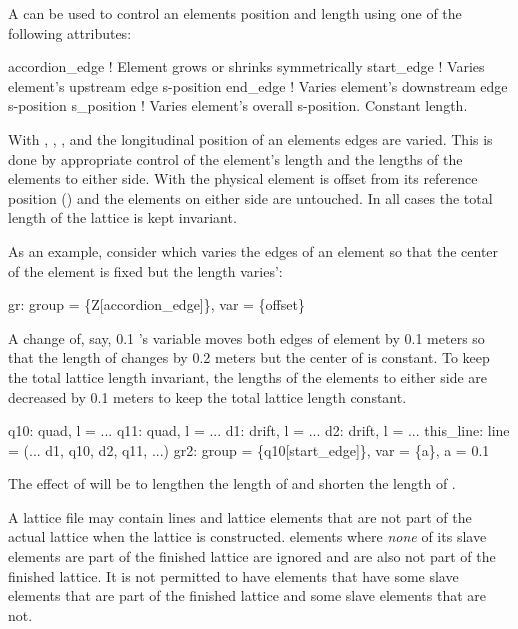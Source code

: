 A  can be used to control an elements position and length
using one of the following attributes:
\begin{example}
  accordion_edge  ! Element grows or shrinks symmetrically
  start_edge      ! Varies element's upstream edge s-position
  end_edge        ! Varies element's downstream edge s-position
  s_position      ! Varies element's overall s-position. Constant length.
\end{example}
With , , , and
 the longitudinal position of an elements edges are
varied. This is done by appropriate control of the element's length
and the lengths of the elements to either side. With 
the physical element is offset from its reference position
() and the elements on either side are untouched.  In
all cases the total length of the lattice is kept invariant.

As an example, consider  which varies the edges of
an element so that the center of the element is fixed but the length
varies':
\begin{example}
  gr: group = \{Z[accordion_edge]\}, var = \{offset\}
\end{example}
A change of, say, 0.1 's  variable moves both edges
of element  by 0.1 meters so that the length of  changes
by 0.2 meters but the center of  is constant. To keep the total
lattice length invariant, the lengths of the elements to either side
are decreased by 0.1 meters to keep the total lattice length constant.
\begin{example}
  q10: quad, l = ...
  q11: quad, l = ...
  d1: drift, l = ...
  d2: drift, l = ...
  this_line: line = (... d1, q10, d2, q11, ...)
  gr2: group = \{q10[start_edge]\}, var = \{a\}, a = 0.1
\end{example}
The effect of   will be to lengthen the length of
 and shorten the length of .

A lattice file may contain lines and lattice elements that are not
part of the actual lattice when the lattice is constructed. 
elements where {\em none} of its slave elements are part of the
finished lattice are ignored and are also not part of the finished
lattice. It is not permitted to have  elements that have
some slave elements that are part of the finished lattice and some
slave elements that are not.

